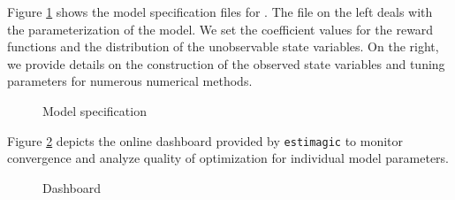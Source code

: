 \noindent Figure \ref{Model specification} shows the model specification files for \citet{Keane.1994}. The file on the left deals with the parameterization of the model. We set the coefficient values for the reward functions and the distribution of the unobservable state variables. On the right, we provide details on the construction of the observed state variables and tuning parameters for numerous numerical methods.

\begin{figure}[h!]\centering
\caption{Model specification}\label{Model specification}
\hspace{0.3cm}
\end{figure}\FloatBarrier


\noindent Figure \ref{Dashboard} depicts the online dashboard provided by \verb+estimagic+ to monitor convergence and analyze quality of optimization for individual model parameters.

\begin{figure}[h!]\centering
\caption{Dashboard}\label{Dashboard}
\end{figure}\FloatBarrier
